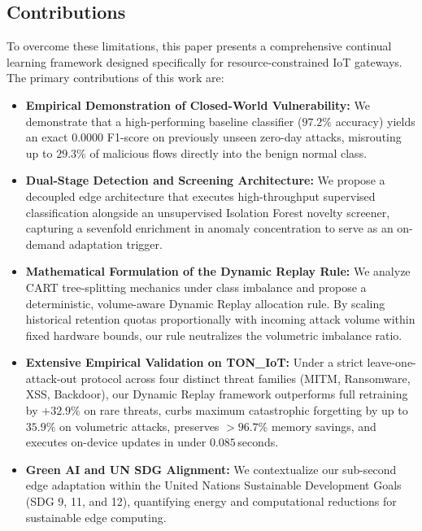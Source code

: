 \documentclass[conference]{IEEEtran}
\begin{document}
\subsection{Contributions}
To overcome these limitations, this paper presents a comprehensive continual learning framework designed specifically for resource-constrained IoT gateways. The primary contributions of this work are:
\begin{itemize}
    \item \textbf{Empirical Demonstration of Closed-World Vulnerability:} We demonstrate that a high-performing baseline classifier ($97.2\%$ accuracy) yields an exact $0.0000$ F1-score on previously unseen zero-day attacks, misrouting up to $29.3\%$ of malicious flows directly into the benign normal class.
    \item \textbf{Dual-Stage Detection and Screening Architecture:} We propose a decoupled edge architecture that executes high-throughput supervised classification alongside an unsupervised Isolation Forest novelty screener, capturing a sevenfold enrichment in anomaly concentration to serve as an on-demand adaptation trigger.
    \item \textbf{Mathematical Formulation of the Dynamic Replay Rule:} We analyze CART tree-splitting mechanics under class imbalance and propose a deterministic, volume-aware Dynamic Replay allocation rule. By scaling historical retention quotas proportionally with incoming attack volume within fixed hardware bounds, our rule neutralizes the volumetric imbalance ratio.
    \item \textbf{Extensive Empirical Validation on TON\_IoT:} Under a strict leave-one-attack-out protocol across four distinct threat families (MITM, Ransomware, XSS, Backdoor), our Dynamic Replay framework outperforms full retraining by $+32.9\%$ on rare threats, curbs maximum catastrophic forgetting by up to $35.9\%$ on volumetric attacks, preserves $>96.7\%$ memory savings, and executes on-device updates in under $0.085$\,seconds.
    \item \textbf{Green AI and UN SDG Alignment:} We contextualize our sub-second edge adaptation within the United Nations Sustainable Development Goals (SDG 9, 11, and 12), quantifying energy and computational reductions for sustainable edge computing.
\end{itemize}

\end{document}
